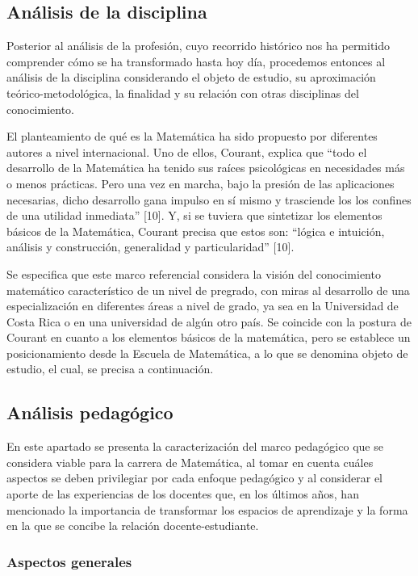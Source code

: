 \subsection{Análisis de la disciplina}

Posterior al análisis de la profesión, cuyo recorrido histórico nos ha permitido comprender cómo se ha transformado hasta hoy día, procedemos entonces al análisis de la disciplina considerando el objeto de estudio, su aproximación teórico-metodológica, la finalidad y su relación con otras disciplinas del conocimiento.

El planteamiento de qué es la Matemática ha sido propuesto por diferentes autores a nivel internacional. Uno de ellos, Courant, explica que “todo el desarrollo de la Matemática ha tenido sus raíces psicológicas en necesidades más o menos prácticas. Pero una vez en marcha, bajo la presión de las aplicaciones necesarias, dicho desarrollo gana impulso en sí mismo y trasciende los los confines de una utilidad inmediata” [10]. Y, si se tuviera que sintetizar los elementos básicos de la Matemática, Courant precisa que estos son: “lógica e intuición, análisis y construcción, generalidad y particularidad” [10].

Se especifica que este marco referencial considera la visión del conocimiento matemático característico de un nivel de pregrado, con miras al desarrollo de una especialización en diferentes áreas a nivel de grado, ya sea en la Universidad de Costa Rica o en una universidad de algún otro país. Se coincide con la postura de Courant en cuanto a los elementos básicos de la matemática, pero se establece un posicionamiento desde la Escuela de Matemática, a lo que se denomina objeto de estudio, el cual, se precisa a continuación. 

\subsection{Análisis pedagógico}

En este apartado se presenta la caracterización del marco pedagógico que se considera viable para la carrera de Matemática, al tomar en cuenta cuáles aspectos se deben privilegiar por cada enfoque pedagógico y al considerar el aporte de las experiencias de los docentes que, en los últimos años, han mencionado la importancia de transformar los espacios de aprendizaje y la forma en la que se concibe la relación docente-estudiante. 

\subsubsection{Aspectos generales}

